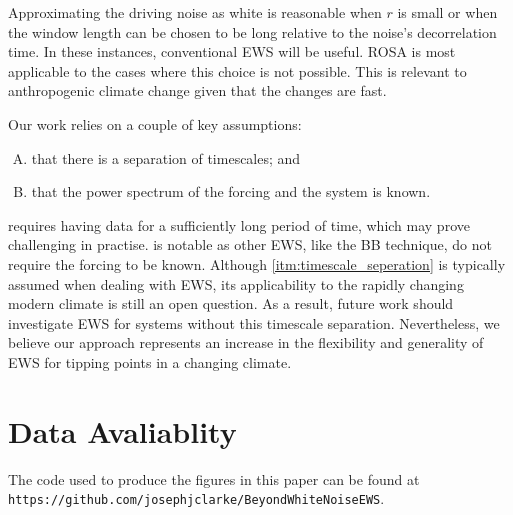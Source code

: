 Approximating the driving noise as white is reasonable when $r$ is 
small or when the window length can be chosen to be long relative to the 
noise's decorrelation time. In these instances, conventional EWS will be useful. ROSA is most applicable to the cases where this choice is not
possible. This is relevant to anthropogenic climate change given that the changes are fast.

Our work relies on a couple of  key assumptions:
\begin{enumerate}[A.]
\item \label{itm:timescale_seperation} that there is a separation of timescales; and
\item \label{itm:exists} that the power spectrum of the forcing and the system is known.
\end{enumerate}
 requires having data for a sufficiently long period of time, which may 
prove challenging in practise.  is notable as other EWS, like the BB technique, do not require the forcing to be known.
Although \cref{itm:timescale_seperation} is typically assumed when dealing with EWS, its applicability
to the rapidly changing modern climate is still an open question.
As a result, future work should investigate EWS for systems without this timescale separation.
Nevertheless, we believe our approach represents an increase in the flexibility and generality of EWS for tipping points in a changing climate.


\section*{Data Avaliablity}
The code used to produce the figures in this paper can be found at \texttt{https://github.com/josephjclarke/BeyondWhiteNoiseEWS}.



